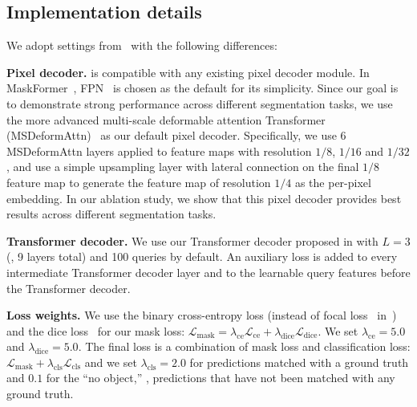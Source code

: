 \begin{table}[t]
   \caption{\textbf{Instance segmentation on COCO \texttt{val2017} with 80 categories.} \modelname outperforms strong Mask R-CNN~\cite{he2017mask} baselines for both AP and AP$^\text{boundary}$~\cite{cheng2021boundary} metrics when training with $8\x$ fewer epochs. Our best model is also competitive to the state-of-the-art specialized instance segmentation model on COCO and has higher boundary quality. For a fair comparison, we only consider single-scale inference and models trained using only COCO \texttt{train2017} set data.
Backbones pre-trained on ImageNet-22K are marked with $^{\text{\textdagger}}$.}

\vspace{-3mm}

\label{tab:insseg:coco}
\end{table}





\subsection{Implementation details}
\label{sec:exp:impl}
\noindent We adopt settings from~\cite{cheng2021maskformer} with the following differences:


\noindent\textbf{Pixel decoder.} \modelname is compatible with %
any existing pixel decoder module. %
In MaskFormer~\cite{cheng2021maskformer}, FPN~\cite{lin2016feature} is chosen as the default %
for its simplicity. Since our goal is to demonstrate strong performance across different segmentation tasks, %
we use the more advanced multi-scale deformable attention Transformer (MSDeformAttn)~\cite{zhu2021deformable} as our default pixel decoder. Specifically, we use 6 MSDeformAttn layers applied to feature maps with resolution $1/8$, $1/16$ and $1/32$,
and use a simple upsampling layer with lateral connection on the final %
$1/8$ feature map to generate the  feature map of resolution $1/4$ as the per-pixel embedding.
In our ablation study, we show that this pixel decoder provides best results across different segmentation tasks.

\noindent\textbf{Transformer decoder.} We use our Transformer decoder proposed in  with $L=3$ (\ie, 9 layers total) and 100 queries by default. An auxiliary loss is added to every intermediate Transformer decoder layer and to the learnable query features before the Transformer decoder.

\noindent\textbf{Loss weights.} We use the binary cross-entropy loss (instead of focal loss~\cite{lin2017focal} in~\cite{cheng2021maskformer}) and the dice loss~\cite{milletari2016v} for our mask loss: $\mathcal{L}_{\text{mask}} = \lambda_{\text{ce}}\mathcal{L}_{\text{ce}} +\lambda_{\text{dice}}\mathcal{L}_{\text{dice}}$. We set $\lambda_{\text{ce}} = 5.0$ and $\lambda_{\text{dice}} = 5.0$. The final loss is a combination of mask loss and classification loss: $\mathcal{L}_{\text{mask}} + \lambda_{\text{cls}}\mathcal{L}_{\text{cls}}$ and we set $\lambda_{\text{cls}} = 2.0$ for predictions matched with a ground truth and $0.1$ for the ``no object,'' \ie, predictions that have not been matched with any ground truth.


